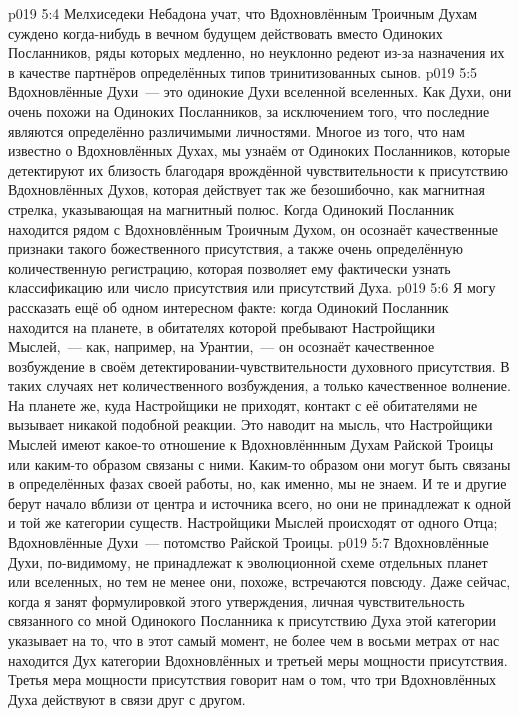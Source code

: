 \vs p019 5:4 Мелхиседеки Небадона учат, что Вдохновлённым Троичным Духам суждено когда\hyp{}нибудь в вечном будущем действовать вместо Одиноких Посланников, ряды которых медленно, но неуклонно редеют из\hyp{}за назначения их в качестве партнёров определённых типов тринитизованных сынов.
\vs p019 5:5 \pc Вдохновлённые Духи~--- это одинокие Духи вселенной вселенных. Как Духи, они очень похожи на Одиноких Посланников, за исключением того, что последние являются определённо различимыми личностями. Многое из того, что нам известно о Вдохновлённых Духах, мы узнаём от Одиноких Посланников, которые детектируют их близость благодаря врождённой чувствительности к присутствию Вдохновлённых Духов, которая действует так же безошибочно, как магнитная стрелка, указывающая на магнитный полюс. Когда Одинокий Посланник находится рядом с Вдохновлённым Троичным Духом, он осознаёт качественные признаки такого божественного присутствия, а также очень определённую количественную регистрацию, которая позволяет ему фактически узнать классификацию или число присутствия или присутствий Духа.
\vs p019 5:6 Я могу рассказать ещё об одном интересном факте: когда Одинокий Посланник находится на планете, в обитателях которой пребывают Настройщики Мыслей,~--- как, например, на Урантии,~--- он осознаёт качественное возбуждение в своём детектировании\hyp{}чувствительности духовного присутствия. В таких случаях нет количественного возбуждения, а только качественное волнение. На планете же, куда Настройщики не приходят, контакт с её обитателями не вызывает никакой подобной реакции. Это наводит на мысль, что Настройщики Мыслей имеют какое\hyp{}то отношение к Вдохновлённным Духам Райской Троицы или каким\hyp{}то образом связаны с ними. Каким\hyp{}то образом они могут быть связаны в определённых фазах своей работы, но, как именно, мы не знаем. И те и другие берут начало вблизи от  центра и источника всего, но они не принадлежат к одной и той же категории существ. Настройщики Мыслей происходят от одного Отца; Вдохновлённые Духи~--- потомство Райской Троицы.
\vs p019 5:7 Вдохновлённые Духи, по\hyp{}видимому, не принадлежат к эволюционной схеме отдельных планет или вселенных, но тем не менее они, похоже, встречаются повсюду. Даже сейчас, когда я занят формулировкой этого утверждения, личная чувствительность связанного со мной Одинокого Посланника к присутствию Духа этой категории указывает на то, что в этот самый момент, не более чем в восьми метрах от нас находится Дух категории Вдохновлённых и третьей меры мощности присутствия. Третья мера мощности присутствия говорит нам о том, что три Вдохновлённых Духа действуют в связи друг с другом.
